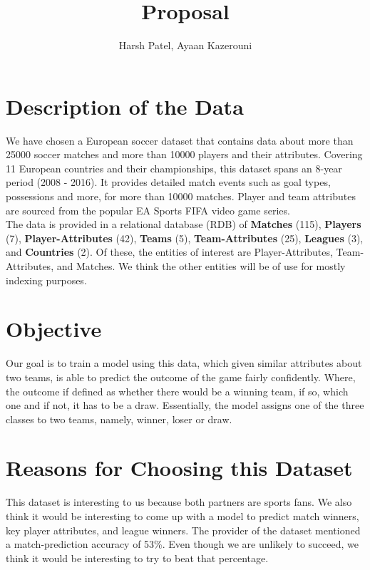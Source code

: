 \documentclass[11pt, letterpaper]{article}
\begin{document}
\title{Proposal}
\author{Harsh Patel, Ayaan Kazerouni}
\date{}
\maketitle

\section*{Description of the Data}
We have chosen a European soccer dataset that contains data about more than 25000 soccer matches and more than 10000 players and their attributes.
Covering 11 European countries and their championships, this dataset spans an 8-year period (2008 - 2016).
It provides detailed match events such as goal types, possessions and more, for more than 10000 matches.
Player and team attributes are sourced from the popular EA Sports FIFA video game series.
\newline
\\
The data is provided in a relational database (RDB) of \textbf{Matches} (115), \textbf{Players} (7), \textbf{Player-Attributes} (42), \textbf{Teams} (5), \textbf{Team-Attributes} (25), \textbf{Leagues} (3), and \textbf{Countries} (2).
Of these, the entities of interest are Player-Attributes, Team-Attributes, and Matches.
We think the other entities will be of use for mostly indexing purposes.

\section*{Objective}
Our goal is to train a model using this data, which given similar attributes about two teams, is able to predict the outcome of the game fairly confidently. 
Where, the outcome if defined as whether there would be a winning team, if so, which one and if not, it has to be a draw. 
Essentially, the model assigns one of the three classes to two teams, namely, winner, loser or draw.

\section*{Reasons for Choosing this Dataset}
This dataset is interesting to us because both partners are sports fans.
We also think it would be interesting to come up with a model to predict match winners, key player attributes, and league winners.
The provider of the dataset mentioned a match-prediction accuracy of 53\%.
Even though we are unlikely to succeed, we think it would be interesting to try to beat that percentage.
\end{document}

